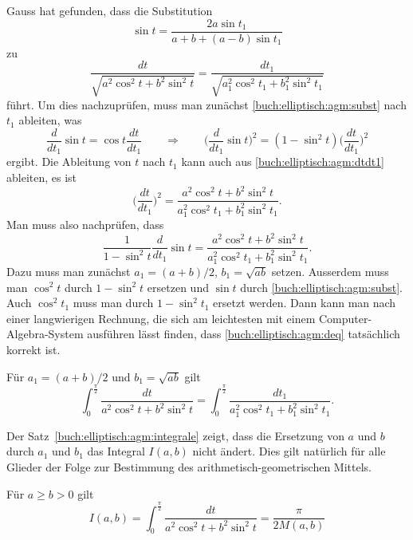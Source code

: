 Gauss hat gefunden, dass die Substitution
\begin{equation}
\sin t
=
\frac{2a\sin t_1}{a+b+(a-b)\sin t_1}
\label{buch:elliptisch:agm:subst}
\end{equation}
zu
\begin{equation}
\frac{dt}{\sqrt{a^2_{\phantom{1}}\cos^2 t + b^2_{\phantom{1}} \sin^2 t}}
=
\frac{dt_1}{\sqrt{a_1^2\cos^2 t_1 + b_1^2 \sin^2 t_1}}
\label{buch:elliptisch:agm:dtdt1}
\end{equation}
führt.
Um dies nachzuprüfen, muss man zunächst
\eqref{buch:elliptisch:agm:subst}
nach $t_1$ ableiten, was
\[
\frac{d}{dt_1}\sin t
=
\cos t
\frac{dt}{dt_1}
\qquad\Rightarrow\qquad
\biggl(
\frac{d}{dt_1}\sin t
\biggr)^2
=
(1-\sin^2t)\biggl(\frac{dt}{dt_1}\biggr)^2
\]
ergibt.
Die Ableitung von $t$ nach $t_1$ kann auch aus
\eqref{buch:elliptisch:agm:dtdt1}
ableiten, es ist
\[
\biggl(
\frac{dt}{dt_1}
\biggr)^2
=
\frac{a^2_{\phantom{1}} \cos^2 t + b^2_{\phantom{1}} \sin^2 t}{a_1^2 \cos^2 t_1 + b_1^2 \sin^2 t_1}.
\]
Man muss also nachprüfen, dass
\begin{equation}
\frac{1}{1-\sin^2 t}
\frac{d}{dt_1}\sin t
=
\frac{a^2 \cos^2 t + b^2 \sin^2 t}{a_1^2 \cos^2 t_1 + b_1^2 \sin^2 t_1}.
\label{buch:elliptisch:agm:deq}
\end{equation}
Dazu muss man zunächst $a_1=(a+b)/2$, $b_1=\!\sqrt{ab}$ setzen.
Ausserdem muss man $\cos^2 t$ durch $1-\sin^2t$ ersetzen und
$\sin t$ durch \eqref{buch:elliptisch:agm:subst}.
Auch $\cos^2 t_1$ muss man durch $1-\sin^2t_1$ ersetzt werden.
Dann kann man nach einer langwierigen Rechnung, die sich am leichtesten
mit einem Computer-Algebra-System ausführen lässt finden, dass
\eqref{buch:elliptisch:agm:deq}
tatsächlich korrekt ist.

\begin{satz}
\label{buch:elliptisch:agm:integrale}
Für $a_1=(a+b)/2$ und $b_1=\sqrt{ab}$ gilt
\[
\int_0^{\frac{\pi}2}
\frac{dt}{a^2\cos^2 t + b^2 \sin^2 t}
=
\int_0^{\frac{\pi}2}
\frac{dt_1}{a_1^2\cos^2 t_1 + b_1^2 \sin^2 t_1}.
\]
\end{satz}

Der Satz~\ref{buch:elliptisch:agm:integrale} zeigt, dass die Ersetzung
von $a$ und $b$ durch $a_1$ und $b_1$ das Integral $I(a,b)$ nicht ändert.
Dies gilt natürlich für alle Glieder der Folge zur Bestimmung des
arithmetisch-geometrischen Mittels.

\begin{satz}
Für $a\ge b>0$ gilt
\begin{equation}
I(a,b)
=
\int_0^{\frac{\pi}2}
\frac{dt}{a^2\cos^2 t + b^2\sin^2t}
=
\frac{\pi}{2M(a,b)}
\end{equation}
\end{satz}

